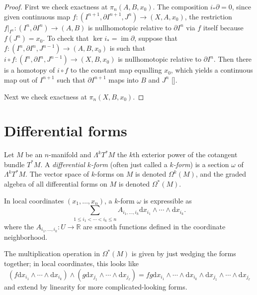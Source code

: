\documentclass[10pt]{article}
\providecommand{\dd}{\mathrm d}
\providecommand{\RR}{\mathbb R}
\providecommand{\opname}{\operatorname}
\providecommand{\im}{\opname{im}}
\newcommand{\expow}{\Lambda}
\providecommand{\vocab}[1]{{{\sffamily\textit{#1}}}}
\begin{document}
\begin{proof} 
    First we check exactness at $\pi_n(A,B,x_0)$.
    The composition $i_*\partial = 0$, since
    given continuous map $f\colon(I^{n+1},\partial I^{n+1},J^n)\to(X,A,x_0)$,
    the restriction $f|_{I^n}\colon(I^{n},\partial I^{n})\to(A,B)$
    is nullhomotopic relative to $\partial I^{n}$
    via $f$ itself because $f(J^{n}) = x_0$.
    To check that $\ker i_* = \im\partial$,
    suppose that $f\colon(I^{n},\partial I^{n},J^{n-1})\to(A,B,x_0)$
    is such that $i\circ f\colon(I^n,\partial I^n,J^{n-1})\to(X,B,x_0)$
    is nullhomotopic relative to $\partial I^n$.
    Then there is a homotopy of $i\circ f$ to the constant map equalling $x_0$,
    which yields a continuous map out of $I^{n+1}$
    such that $\partial I^{n+1}$ maps into $B$ and $J^n$ [].

    Next we check exactness at $\pi_n(X,B,x_0)$.
\end{proof}




\section{Differential forms}

\begin{definition}
    \label{def:differential-form}
    Let $M$ be an $n$-manifold and $\expow^k T^*M$
    the $k$th exterior power of the cotangent bundle $T^*M$.
    A \vocab{differential $k$-form}
    (often just called a \vocab{$k$-form}) is a section
    $\omega$ of $\expow^k T^*M$.
    The vector space of $k$-forms on $M$ is denoted
    $\Omega^k(M)$, and the graded algebra of all differential forms on $M$
    is denoted $\Omega^*(M)$.
\end{definition}

In local coordinates $(x_1,\dots,x_n)$, a $k$-form $\omega$
is expressible as
\begin{equation*}
    \sum_{1\le i_1<\cdots<i_k\le n} A_{i_1,\dots,i_k}
    \dd x_{i_1}\wedge\cdots\wedge\dd x_{i_k}.
\end{equation*}
where the $A_{i_1,\dots,i_k}\colon U\to\RR$
are smooth functions defined in the coordinate neighborhood.

The multiplication operation in $\Omega^*(M)$ is given by
just wedging the forms together; in local coordinates, this looks like
\begin{equation*}
    (f\dd x_{i_1}\wedge\cdots\wedge\dd x_{i_k})
    \wedge(g\dd x_{j_1}\wedge\cdots\wedge\dd x_{j_\ell})
    = fg\dd x_{i_1}\wedge\cdots\wedge\dd x_{i_k}
    \wedge\dd x_{j_1}\wedge\cdots\wedge\dd x_{j_\ell}
\end{equation*}
and extend by linearity for more complicated-looking forms.
\end{document}
